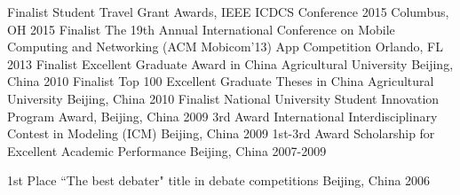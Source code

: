 \begin{cvhonors}
  \cvhonor
    {Finalist}
    {Student Travel Grant Awards, IEEE ICDCS Conference 2015}
    {Columbus, OH }
    {2015}
  \cvhonor
    {Finalist}
    {The 19th Annual International Conference on Mobile Computing and Networking (ACM Mobicom'13) App Competition}
    {Orlando, FL}
    {2013}
  \cvhonor
    {Finalist}
    {Excellent Graduate Award in China Agricultural University}
    {Beijing, China}
    {2010}
  \cvhonor
    {Finalist}
    {Top 100 Excellent Graduate Theses in China Agricultural University}
    {Beijing, China}
    {2010}
  \cvhonor
    {Finalist}
    {National University Student Innovation Program Award,}
    {Beijing, China}
    {2009}
      \cvhonor
    {3rd Award}
    {International Interdisciplinary Contest in Modeling (ICM)}
    {Beijing, China}
    {2009}
          \cvhonor
     {1st-3rd Award}
    { Scholarship for Excellent Academic Performance}
    {Beijing, China}
    {2007-2009}

          \cvhonor
     {1st Place}
    {``The best debater"  title in debate competitions}
    {Beijing, China}
    {2006}
\end{cvhonors}
